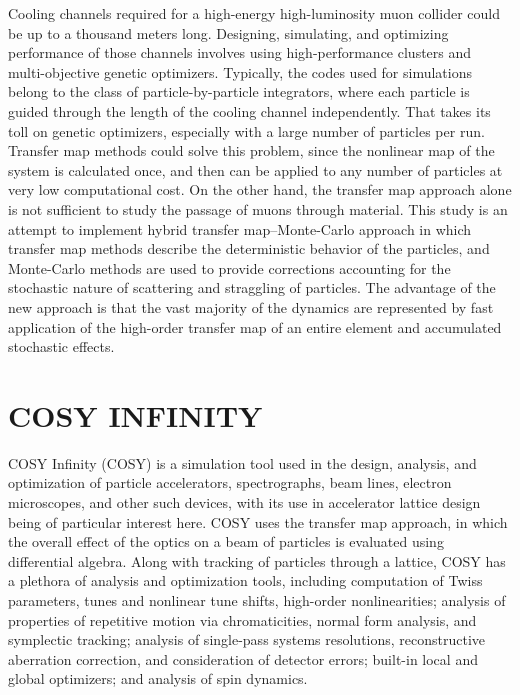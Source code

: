 \documentclass[a4paper,11pt]{article}
\begin{document}
Cooling channels required for a high-energy high-luminosity muon collider could be up to a thousand meters long. Designing, simulating, and optimizing performance of those channels involves using high-performance clusters and multi-objective genetic optimizers. Typically, the codes used for simulations belong to the class of particle-by-particle integrators, where each particle is guided through the length of the cooling channel independently. That takes its toll on genetic optimizers, especially with a large number of particles per run. Transfer map methods could solve this problem, since the nonlinear map of the system is calculated once, and then can be applied to any number of particles at very low computational cost. On the other hand, the transfer map approach alone is not sufficient to study the passage of muons through material. This study is an attempt to implement hybrid transfer map--Monte-Carlo approach in which transfer map methods describe the deterministic behavior of the particles, and Monte-Carlo methods are used to provide corrections accounting for the stochastic nature of scattering and straggling of particles. The advantage of the new approach is that the vast majority of the dynamics are represented by fast application of the high-order transfer map of an entire element and accumulated stochastic effects.

\section{COSY INFINITY}

COSY Infinity (COSY) \cite{COSY} is a simulation tool used in the design, analysis, and optimization of particle accelerators, spectrographs, beam lines, electron microscopes, and other such devices, with its use in accelerator lattice design being of particular interest here. COSY uses the transfer map approach, in which the overall effect of the optics on a beam of particles is evaluated using differential algebra. Along with tracking of particles through a lattice, COSY has a plethora of analysis and optimization tools, including computation of Twiss parameters, tunes and nonlinear tune shifts, high-order nonlinearities; analysis of properties of repetitive motion via chromaticities, normal form analysis, and symplectic tracking; analysis of single-pass systems resolutions, reconstructive aberration correction, and consideration of detector errors; built-in local and global optimizers; and analysis of spin dynamics.
\end{document}

